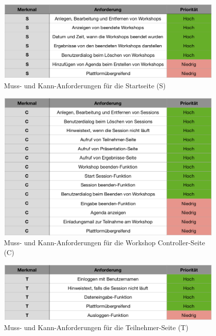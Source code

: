 \begin{figure}[H]
  \centering  
  \includegraphics[scale=0.6]{img/Startseite.png}
  \caption{Muss- und Kann-Anforderungen für die Startseite (S)}
  \label{fig:startseite}
\end{figure}	

\begin{figure}[H]
  \centering  
  \includegraphics[scale=0.6]{img/Controller-Seite.png}
  \caption{Muss- und Kann-Anforderungen für die Workshop Controller-Seite (C)}
  \label{fig:controller-seite}
\end{figure}

\begin{figure}[H]
  \centering  
  \includegraphics[scale=0.6]{img/Teilnehmer-Seite.png}
  \caption{Muss- und Kann-Anforderungen für die Teilnehmer-Seite (T)}
  \label{fig:teilnehmer-seite}
\end{figure}

